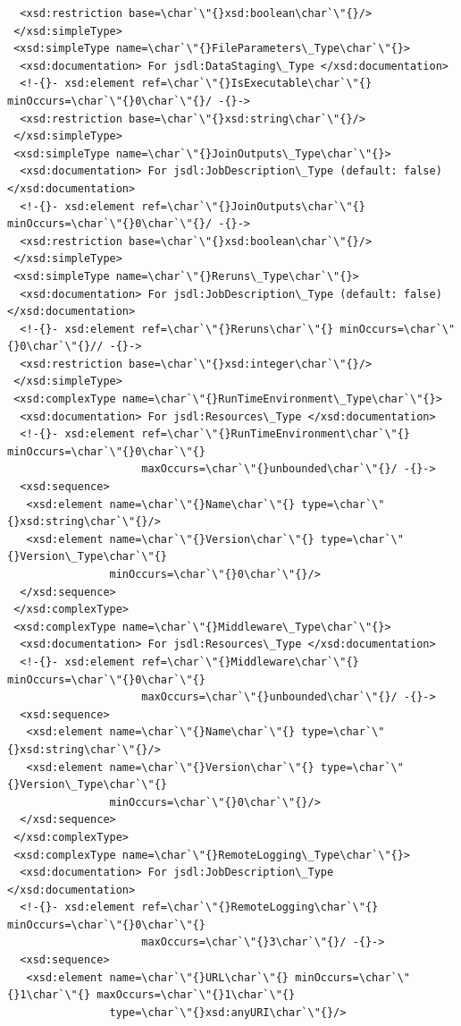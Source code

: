 \documentclass{article}                            %
\begin{document}
\begin{footnotesize}
\begin{verbatim}
  <xsd:restriction base=\char`\"{}xsd:boolean\char`\"{}/>
 </xsd:simpleType>
 <xsd:simpleType name=\char`\"{}FileParameters\_Type\char`\"{}>
  <xsd:documentation> For jsdl:DataStaging\_Type </xsd:documentation>
  <!-{}- xsd:element ref=\char`\"{}IsExecutable\char`\"{} minOccurs=\char`\"{}0\char`\"{}/ -{}->
  <xsd:restriction base=\char`\"{}xsd:string\char`\"{}/>
 </xsd:simpleType>
 <xsd:simpleType name=\char`\"{}JoinOutputs\_Type\char`\"{}>
  <xsd:documentation> For jsdl:JobDescription\_Type (default: false) </xsd:documentation>
  <!-{}- xsd:element ref=\char`\"{}JoinOutputs\char`\"{} minOccurs=\char`\"{}0\char`\"{}/ -{}->
  <xsd:restriction base=\char`\"{}xsd:boolean\char`\"{}/>
 </xsd:simpleType>
 <xsd:simpleType name=\char`\"{}Reruns\_Type\char`\"{}>
  <xsd:documentation> For jsdl:JobDescription\_Type (default: false) </xsd:documentation>
  <!-{}- xsd:element ref=\char`\"{}Reruns\char`\"{} minOccurs=\char`\"{}0\char`\"{}// -{}->
  <xsd:restriction base=\char`\"{}xsd:integer\char`\"{}/>
 </xsd:simpleType>
 <xsd:complexType name=\char`\"{}RunTimeEnvironment\_Type\char`\"{}>
  <xsd:documentation> For jsdl:Resources\_Type </xsd:documentation>
  <!-{}- xsd:element ref=\char`\"{}RunTimeEnvironment\char`\"{} minOccurs=\char`\"{}0\char`\"{}
                     maxOccurs=\char`\"{}unbounded\char`\"{}/ -{}->
  <xsd:sequence>
   <xsd:element name=\char`\"{}Name\char`\"{} type=\char`\"{}xsd:string\char`\"{}/>
   <xsd:element name=\char`\"{}Version\char`\"{} type=\char`\"{}Version\_Type\char`\"{}
                minOccurs=\char`\"{}0\char`\"{}/>
  </xsd:sequence>
 </xsd:complexType>
 <xsd:complexType name=\char`\"{}Middleware\_Type\char`\"{}>
  <xsd:documentation> For jsdl:Resources\_Type </xsd:documentation>
  <!-{}- xsd:element ref=\char`\"{}Middleware\char`\"{} minOccurs=\char`\"{}0\char`\"{}
                     maxOccurs=\char`\"{}unbounded\char`\"{}/ -{}->
  <xsd:sequence>
   <xsd:element name=\char`\"{}Name\char`\"{} type=\char`\"{}xsd:string\char`\"{}/>
   <xsd:element name=\char`\"{}Version\char`\"{} type=\char`\"{}Version\_Type\char`\"{}
                minOccurs=\char`\"{}0\char`\"{}/>
  </xsd:sequence>
 </xsd:complexType>
 <xsd:complexType name=\char`\"{}RemoteLogging\_Type\char`\"{}>
  <xsd:documentation> For jsdl:JobDescription\_Type </xsd:documentation>
  <!-{}- xsd:element ref=\char`\"{}RemoteLogging\char`\"{} minOccurs=\char`\"{}0\char`\"{}
                     maxOccurs=\char`\"{}3\char`\"{}/ -{}->
  <xsd:sequence>
   <xsd:element name=\char`\"{}URL\char`\"{} minOccurs=\char`\"{}1\char`\"{} maxOccurs=\char`\"{}1\char`\"{}
                type=\char`\"{}xsd:anyURI\char`\"{}/>

\end{verbatim}
\end{footnotesize}
\end{document}
